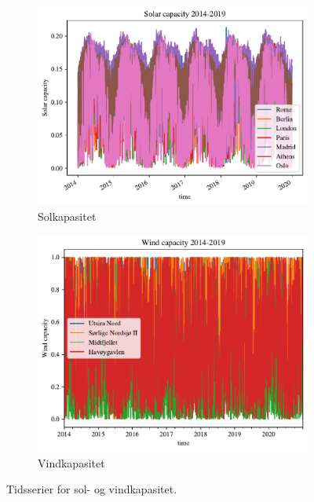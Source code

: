 \documentclass{article}
\begin{document}
\begin{figure}[ht]
\centering
\begin{subfigure}{.5\textwidth}
    \centering
    \includegraphics[width=\linewidth]{figures/Solar/Solar capacity 2014-2019.pdf}
    \caption{Solkapasitet}
    \label{fig:ren_sol}
\end{subfigure}%
\begin{subfigure}{.5\textwidth}
    \centering
    \includegraphics[width=\linewidth]{figures/Wind/Wind capacity 2014-2019.pdf}
    \caption{Vindkapasitet}
    \label{fig:ren_vind}
\end{subfigure}
\caption{Tidsserier for sol- og vindkapasitet.}
\label{fig:rene_tidserier}
\end{figure}
\end{document}

